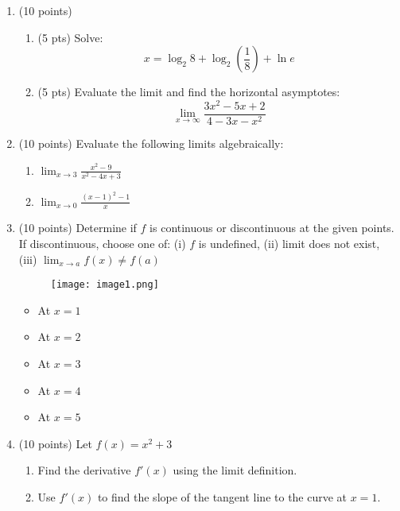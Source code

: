 \begin{enumerate}
    \item (10 points)
    \begin{enumerate}
        \item (5 pts) Solve:
        \[
        x = \log_2 8 + \log_2 \left(\frac{1}{8}\right) + \ln e
        \]

        \item (5 pts) Evaluate the limit and find the horizontal asymptotes:
        \[
        \lim_{x \to \infty} \frac{3x^2 - 5x + 2}{4 - 3x - x^2}
        \]
    \end{enumerate}

    \item (10 points) Evaluate the following limits algebraically:
    \begin{enumerate}
        \item \( \lim_{x \to 3} \frac{x^2 - 9}{x^2 - 4x + 3} \)
        \item \( \lim_{x \to 0} \frac{(x - 1)^2 - 1}{x} \)
    \end{enumerate}

    \item (10 points) Determine if \( f \) is continuous or discontinuous at the given points. If discontinuous, choose one of: 
    (i) \( f \) is undefined, 
    (ii) limit does not exist, 
    (iii) \( \lim_{x \to a} f(x) \neq f(a) \)
    \begin{figure}[ht!]
        \centering
        \texttt{[image: image1.png]}
    \end{figure}
    \begin{itemize}
        \item At \( x = 1 \)
        \item At \( x = 2 \)
        \item At \( x = 3 \)
        \item At \( x = 4 \)
        \item At \( x = 5 \)
    \end{itemize}

    \item (10 points) Let \( f(x) = x^2 + 3 \)
    \begin{enumerate}
        \item Find the derivative \( f'(x) \) using the limit definition.
        \item Use \( f'(x) \) to find the slope of the tangent line to the curve at \( x = 1 \).
    \end{enumerate}


\end{enumerate}
